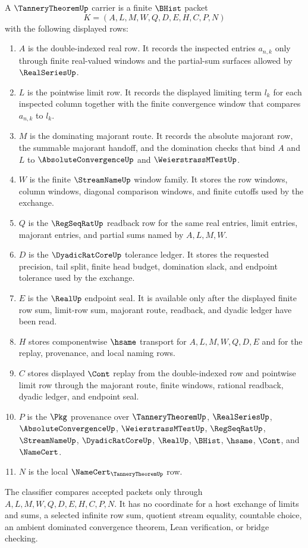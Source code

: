 \begin{definition}
\label{def:tannery-theorem-carrier}
A $\TanneryTheoremUp$ carrier is a finite $\BHist$ packet
$$
K=(A,L,M,W,Q,D,E,H,C,P,N)
$$
with the following displayed rows:
\begin{enumerate}
\item $A$ is the double-indexed real row. It records the inspected entries $a_{n,k}$ only through finite real-valued windows and the partial-sum surfaces allowed by $\RealSeriesUp$.
\item $L$ is the pointwise limit row. It records the displayed limiting term $l_k$ for each inspected column together with the finite convergence window that compares $a_{n,k}$ to $l_k$.
\item $M$ is the dominating majorant route. It records the absolute majorant row, the summable majorant handoff, and the domination checks that bind $A$ and $L$ to $\AbsoluteConvergenceUp$ and $\WeierstrassMTestUp$.
\item $W$ is the finite $\StreamNameUp$ window family. It stores the row windows, column windows, diagonal comparison windows, and finite cutoffs used by the exchange.
\item $Q$ is the $\RegSeqRatUp$ readback row for the same real entries, limit entries, majorant entries, and partial sums named by $A,L,M,W$.
\item $D$ is the $\DyadicRatCoreUp$ tolerance ledger. It stores the requested precision, tail split, finite head budget, domination slack, and endpoint tolerance used by the exchange.
\item $E$ is the $\RealUp$ endpoint seal. It is available only after the displayed finite row sum, limit-row sum, majorant route, readback, and dyadic ledger have been read.
\item $H$ stores componentwise $\hsame$ transport for $A,L,M,W,Q,D,E$ and for the replay, provenance, and local naming rows.
\item $C$ stores displayed $\Cont$ replay from the double-indexed row and pointwise limit row through the majorant route, finite windows, rational readback, dyadic ledger, and endpoint seal.
\item $P$ is the $\Pkg$ provenance over $\TanneryTheoremUp$, $\RealSeriesUp$, $\AbsoluteConvergenceUp$, $\WeierstrassMTestUp$, $\RegSeqRatUp$, $\StreamNameUp$, $\DyadicRatCoreUp$, $\RealUp$, $\BHist$, $\hsame$, $\Cont$, and $\NameCert$.
\item $N$ is the local $\NameCert_{\TanneryTheoremUp}$ row.
\end{enumerate}
The classifier compares accepted packets only through $A,L,M,W,Q,D,E,H,C,P,N$. It has no coordinate for a host exchange of limits and sums, a selected infinite row sum, quotient stream equality, countable choice, an ambient dominated convergence theorem, Lean verification, or bridge checking.
\end{definition}

